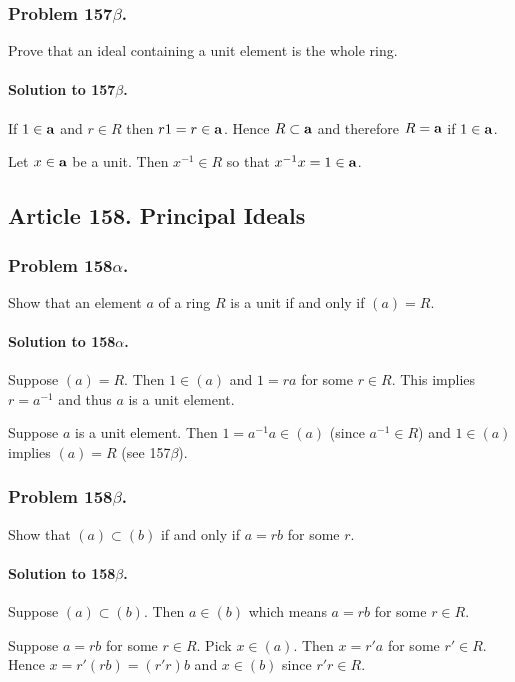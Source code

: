 \subsubsection{Problem 157$\beta$.}
Prove that an ideal containing a unit element is the whole ring.

\paragraph*{Solution to 157$\beta$.}
If $ 1 \in \mathsf{\mathbf{a}} $ and $r \in R$ then $ r1 = r \in \mathsf{\mathbf{a}}$. Hence $R
\subset \mathsf{\mathbf{a}}$ and therefore $ R = \mathsf{\mathbf{a}}$ if $ 1 \in \mathsf{\mathbf{a}}$.

Let $ x \in \mathsf{\mathbf{a}}$ be a unit. Then $x^{-1} \in R$ so that $ x^{-1} x = 1 \in
\mathsf{\mathbf{a}}$.

\subsection{Article 158. Principal Ideals}
\subsubsection{Problem 158$\alpha$.}
Show that an element $a$ of a ring $R$ is a unit if and only if $ (a) = R$.

\paragraph*{Solution to 158$\alpha$.}
Suppose $ (a) = R$. Then $ 1 \in (a)$ and $ 1 = ra$ for some $r \in R$. This
implies $ r = a^{-1}$ and thus $a$ is a unit element.

Suppose $ a $ is a unit element. Then $ 1 = a^{-1} a \in (a)$ (since $a^{-1}
\in R$) and $ 1 \in (a)$ implies $(a) = R$ (see 157$\beta$).

\subsubsection{Problem 158$\beta$.}
Show that $(a) \subset (b)$ if and only if $a = rb$ for some $r$.

\paragraph*{Solution to 158$\beta$.}
Suppose $(a) \subset (b)$. Then $ a \in (b) $ which means $ a = rb $ for some $
r \in R$.

Suppose $ a = rb $ for some $ r \in R$. Pick $x \in (a)$. Then $ x = r'a $ for
some $ r' \in R$. Hence $x = r'(rb) = (r'r)b $ and $ x \in (b) $ since $r'r \in
R$.

